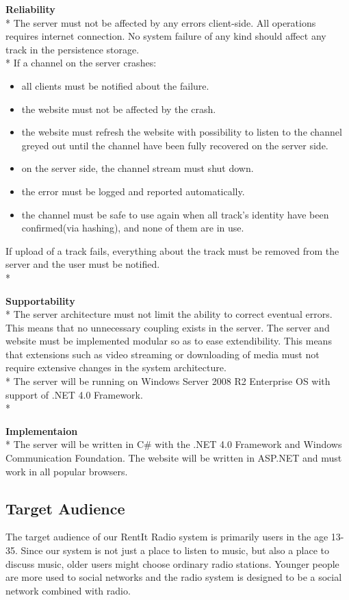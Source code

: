 \documentclass[a4paper,11pt,report]{article}
\begin{document}
\textbf{Reliability} \\*
The server must not be affected by any errors client-side. All operations requires internet connection. No system failure of any kind should affect any track in the persistence storage. \\*
If a channel on the server crashes:
\begin{itemize}
\item all clients must be notified about the failure.
\item the website must not be affected by the crash.
\item the website must refresh the website with possibility to listen to the channel greyed out until the channel have been fully recovered on the server side.
\item on the server side, the channel stream must shut down.
\item the error must be logged and reported automatically. 
\item the channel must be safe to use again when all track's identity have been confirmed(via hashing), and none of them are in use.
\end{itemize}
If upload of a track fails, everything about the track must be removed from the server and the user must be notified. \\*

\textbf{Supportability} \\*
The server architecture must not limit the ability to correct eventual errors. This means that no unnecessary coupling exists in the server.
The server and website must be implemented modular so as to ease extendibility.
This means that extensions such as video streaming or downloading of media must not require extensive changes in the system architecture. \\*
The server will be running on Windows Server 2008 R2 Enterprise OS with support of .NET 4.0 Framework.\\*

\textbf{Implementaion} \\*
The server will be written in C\# with the .NET 4.0 Framework and Windows Communication Foundation.
The website will be written in ASP.NET and must work in all popular browsers.

\subsection{Target Audience}
The target audience of our RentIt Radio system is primarily users in the age 13-35. Since our system is not just a place to listen to music, but also a place to discuss music,  older users might choose ordinary radio stations. Younger people are more used to social networks and the radio system is designed to be a social network combined with radio.
\end{document}
